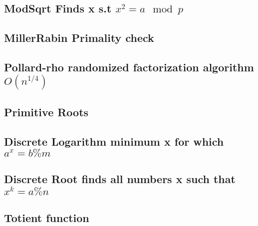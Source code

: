 \subsection{ModSqrt Finds x s.t ${x^2 = a \mod p}$}
\vspace{-2ex}
\raggedbottom
\vspace{-3.2ex}
\hrulefill
\subsection{MillerRabin Primality check}
\vspace{-2ex}
\raggedbottom
\vspace{-3.2ex}
\hrulefill
\subsection{Pollard-rho randomized factorization algorithm ${O(n^{1/4})}$}
\vspace{-2ex}
\raggedbottom
\vspace{-3.2ex}
\hrulefill
\subsection{Primitive Roots}
\vspace{-2ex}
\raggedbottom
\vspace{-3.2ex}
\hrulefill
\subsection{Discrete Logarithm minimum x for which ${a^x = b \% m}$}
\vspace{-2ex}
\raggedbottom
\vspace{-3.2ex}
\hrulefill
\subsection{Discrete Root finds all numbers x such that ${x^k = a \% n}$}
\vspace{-2ex}
\raggedbottom
\vspace{-3.2ex}
\hrulefill
\subsection{Totient function}
\vspace{-2ex}
\raggedbottom
\vspace{-3.2ex}
\hrulefill
